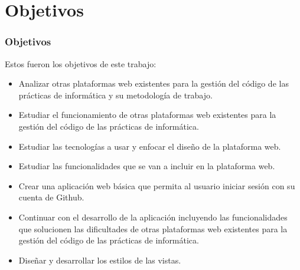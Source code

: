 \documentclass{beamer}
\begin{document}
\section{Objetivos}
\begin{frame}
  \frametitle{Objetivos}
  
  Estos fueron los objetivos de este trabajo:

  \begin{itemize}
    \item Analizar otras plataformas  web existentes para la gestión del código de las prácticas de informática y su metodología de trabajo.
    \item Estudiar el funcionamiento de otras plataformas  web existentes para la gestión del código de las prácticas de informática.
    \item Estudiar las tecnologías a usar y enfocar el diseño de la plataforma web.
    \item Estudiar las funcionalidades que se van a incluir en la plataforma web.
  \end{itemize}

  \framebreak

  \begin{itemize}
    \item Crear una aplicación web básica que permita al usuario iniciar sesión con su cuenta de Github.
    \item Continuar con el desarrollo de la aplicación incluyendo las funcionalidades que solucionen las dificultades de otras plataformas  web existentes para la gestión del código de las prácticas de informática.
    \item Diseñar y desarrollar los estilos de las vistas.
  \end{itemize}
  
\end{frame}

\end{document}
